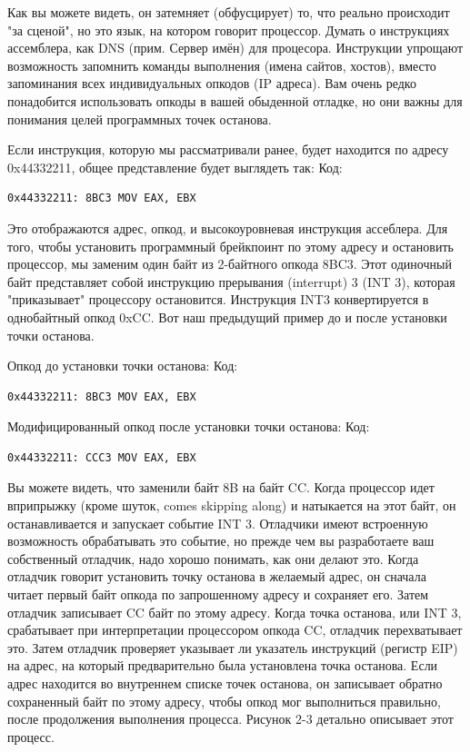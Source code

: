 \documentclass[12pt]{book}
\begin{document}
Как вы можете видеть, он затемняет (обфусцирует) то, что реально происходит "за сценой", но это язык, на котором говорит процессор. Думать о инструкциях ассемблера, как DNS (прим. Сервер имён) для процесора. Инструкции упрощают возможность запомнить команды выполнения (имена сайтов, хостов), вместо запоминания всех индивидуальных опкодов (IP адреса). Вам очень редко понадобится использовать опкоды в вашей обыденной отладке, но они важны для понимания целей программных точек останова.

Если инструкция, которую мы рассматривали ранее, будет находится по адресу 0x44332211, общее представление будет выглядеть так:
Код:
\begin{lstlisting}
0x44332211: 8BC3 MOV EAX, EBX
\end{lstlisting}
Это отображаются адрес, опкод, и высокоуровневая инструкция ассеблера. Для того, чтобы установить программный брейкпоинт по этому адресу и остановить процессор, мы заменим один байт из 2-байтного опкода 8BC3. Этот одиночный байт представляет собой инструкцию прерывания (interrupt) 3 (INT 3), которая "приказывает" процессору остановится. Инструкция INT3 конвертируется в однобайтный опкод 0xCC. Вот наш предыдущий пример до и после установки точки останова.

Опкод до установки точки останова:
Код:
\begin{lstlisting}
0x44332211: 8BC3 MOV EAX, EBX
\end{lstlisting}
Модифицированный опкод после установки точки останова:
Код:
\begin{lstlisting}
0x44332211: CCC3 MOV EAX, EBX
\end{lstlisting}
Вы можете видеть, что заменили байт 8B на байт CC. Когда процессор идет вприпрыжку (кроме шуток, comes skipping along) и натыкается на этот байт, он останавливается и запускает событие INT 3. Отладчики имеют встроенную возможность обрабатывать это событие, но прежде чем вы разработаете ваш собственный отладчик, надо хорошо понимать, как они делают это. Когда отладчик говорит установить точку останова в желаемый адрес, он сначала читает первый байт опкода по запрошенному адресу и сохраняет его. Затем отладчик записывает CC байт по этому адресу. Когда точка останова, или INT 3, срабатывает при интерпретации процессором опкода CC, отладчик перехватывает это. Затем отладчик проверяет указывает ли указатель инструкций (регистр EIP) на адрес, на который предварительно была установлена точка останова. Если адрес находится во внутреннем списке точек останова, он записывает обратно сохраненный байт по этому адресу, чтобы опкод мог выполниться правильно, после продолжения выполнения процесса. Рисунок 2-3 детально описывает этот процесс.
\end{document}
